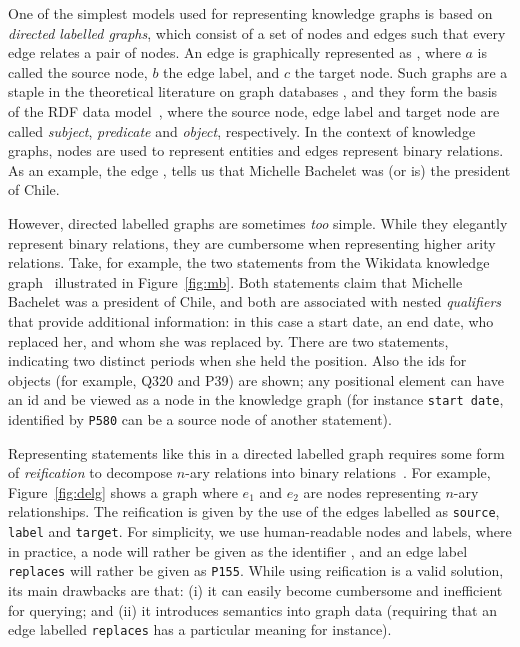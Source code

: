 One of the simplest models used for representing knowledge graphs is based on \textit{directed labelled graphs}, which consist of a set of nodes and edges such that every edge relates a pair of nodes. An edge is graphically represented as , where $a$ is called the source node, $b$ the edge label, and $c$ the target node. Such graphs are a staple in the theoretical literature on graph databases \cite{Baeza13}, and they form the basis of the RDF data model~\cite{CyganiakWL14}, where the source node, edge label and target node are called \textit{subject}, \textit{predicate} and \textit{object}, respectively. In the context of knowledge graphs, nodes are used to represent entities and edges represent binary relations. As an example, the edge , tells us that Michelle Bachelet was (or is) the president of Chile.

However, directed labelled graphs are sometimes \textit{too} simple. While they elegantly represent binary relations, they are cumbersome when representing higher arity relations. Take, for example, the two statements from the Wikidata knowledge graph~\cite{VrandecicK14} illustrated in Figure~\ref{fig:mb}. Both statements claim that Michelle Bachelet was a president of Chile, and both are associated with nested \textit{qualifiers} that provide additional information: in this case a start date, an end date, who replaced her, and whom she was replaced by. There are two statements, indicating two distinct periods when she held the position. Also the ids for objects (for example, \textsf{Q320} and \textsf{P39}) are shown; any positional element can have an id and be viewed as a node in the knowledge graph (for instance \texttt{start date}, identified by \texttt{P580} can be a source node of another statement). 

Representing statements like this in a directed labelled graph requires some form of \textit{reification} to decompose $n$-ary relations into binary relations~\cite{HernandezHK15}. For example, Figure~\ref{fig:delg} shows a graph where $e_1$ and $e_2$ are nodes representing $n$-ary relationships. The reification is given by the use of the edges labelled as \texttt{source}, \texttt{label} and \texttt{target}. For simplicity, we use human-readable nodes and labels, where in practice, a node  will rather be given as the identifier , and an edge label \texttt{replaces} will rather be given as \texttt{P155}. While using reification is a valid solution, its main drawbacks are that: (i) it can easily become cumbersome and inefficient for querying; and (ii) it introduces semantics into graph data (requiring that an edge labelled \texttt{replaces} has a particular meaning for instance).

